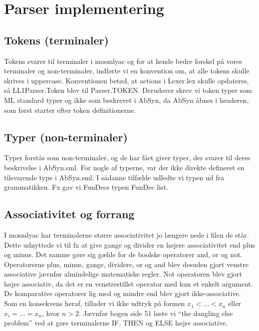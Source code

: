 \documentclass[11pt,a4paper]{article}
\begin{document}
\section*{Parser implementering}
\label{sec:implementation}
\subsection*{Tokens (terminaler)}
Tokens svarer til terminaler i mosmlyac og for at kende bedre forskel
på vores terminaler og non-terminaler, indførte vi en konvention om,
at alle tokens skulle skrives i uppercase. Konventionen betød, at
actions i Lexer.lex skulle opdateres, så LL1Parser.Token blev til
Parser.TOKEN. Derudover skrev vi token typer som ML standard
typer og ikke som beskrevet i AbSyn, da AbSyn åbnes i headeren,
som først starter efter token definitionerne.
\subsection*{Typer (non-terminaler)}
Typer forstås som non-terminaler, og de har fået giver typer, der
svarer til deres beskrivelse i AbSyn.sml. For nogle af typerne,
var der ikke direkte defineret en tilsvarende type i AbSyn.sml.
I sådanne tilfælde udledte vi typen ud fra grammatikken. Fx gav
vi FunDecs typen FunDec list.
\subsection*{Associativitet og forrang}
I mosmlyac har terminalerne større associativitet jo længere
nede i filen de står. Dette udnyttede vi til fx at give gange og divider
en højere associativitet end plus og minus. Det samme gøre sig gælde for
de boolske operatorer and, or og not. Operatorerne plus, minus, gange,
dividere, or og and blev desuden gjort venstre associative jævnfør
almindelige matematiske regler. Not operatoren blev gjort højre
associativ, da det er en venstrestillet operator med kun et enkelt
argument. De komparative operatorer lig med og mindre end blev gjort
ikke-associative. Som en konsekvens heraf, tillader vi ikke udtryk på
formen $x_{1} < \dots < x_{n}$ eller $x_{i} = \dots = x_{n}$, hvor
$n > 2$. Jævnfør bogen side 51 løste vi ``the dangling else problem''
ved at gøre terminalerne IF, THEN og ELSE højre associative.
\end{document}
